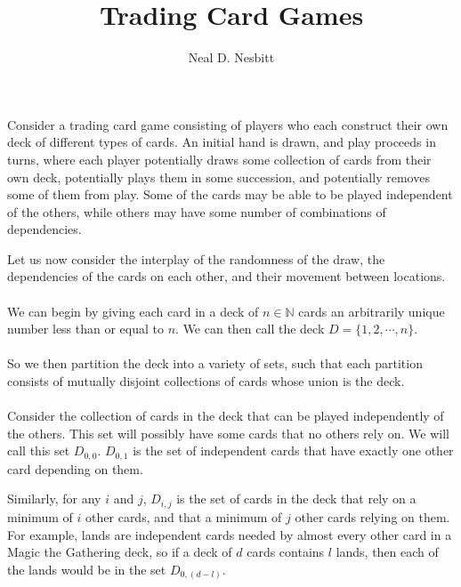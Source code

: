 \documentclass{article}
\title{Trading Card Games}
\author{Neal D. Nesbitt}
\theoremstyle{definition}
\begin{document}
\maketitle

Consider a trading card game consisting of players who each construct their own deck of different types of cards. An initial hand is drawn, and play proceeds in turns, where each player potentially draws some collection of cards from their own deck, potentially plays them in some succession, and potentially removes some of them from play. Some of the cards may be able to be played independent of the others, while others may have some number of combinations of dependencies.

Let us now consider the interplay of the randomness of the draw, the dependencies of the cards on each other, and their movement between locations.

\paragraph{}
We can begin by giving each card in a deck of $n\in\mathbb{N}$ cards an arbitrarily unique number less than or equal to $n$. We can then call the deck $D = \{ 1, 2, \cdots, n \}$.

\paragraph{}
So we then partition the deck into a variety of sets, such that each partition consists of mutually disjoint collections of cards whose union is the deck. 

\paragraph{}
Consider the collection of cards in the deck that can be played independently of the others. This set will possibly have some cards that no others rely on. We will call this set $D_{0,0}$. $D_{0,1}$ is the set of independent cards that have exactly one other card depending on them.

Similarly, for any $i$ and $j$, $D_{i,j}$ is the set of cards in the deck that rely on a minimum of $i$ other cards, and that a minimum of $j$ other cards relying on them. For example, lands are independent cards needed by almost every other card in a Magic the Gathering deck, so if a deck of $d$ cards contains $l$ lands, then each of the lands would be in the set $D_{0,(d-l)}$.
\end{document}
